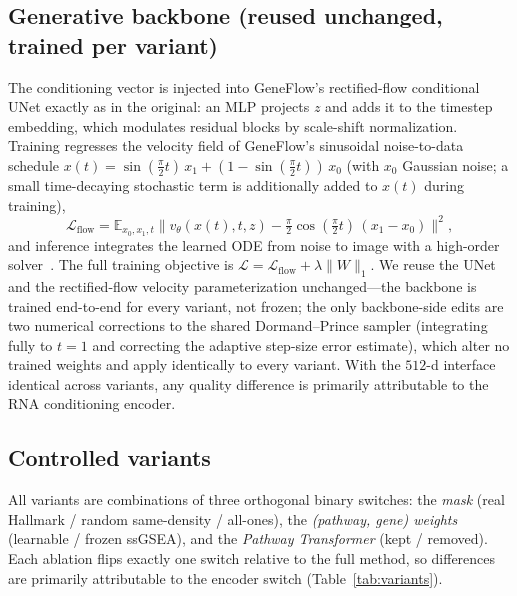 \documentclass[journal]{IEEEtran}
\begin{document}
\subsection{Generative backbone (reused unchanged, trained per variant)}
The conditioning vector is injected into GeneFlow's rectified-flow conditional
UNet exactly as in the original: an MLP projects $z$ and adds it to the timestep
embedding, which modulates residual blocks by scale-shift normalization. Training
regresses the velocity field of GeneFlow's sinusoidal noise-to-data schedule
$x(t)=\sin(\tfrac{\pi}{2}t)\,x_1+(1-\sin(\tfrac{\pi}{2}t))\,x_0$ (with $x_0$
Gaussian noise; a small time-decaying stochastic term is additionally added to
$x(t)$ during training),
\begin{equation}
\mathcal{L}_{\text{flow}}=\mathbb{E}_{x_0,x_1,t}\big\lVert v_\theta(x(t),t,z)-\tfrac{\pi}{2}\cos(\tfrac{\pi}{2}t)\,(x_1-x_0)\big\rVert^2,
\label{eq:flow}
\end{equation}
and inference integrates the learned ODE from noise to image with a high-order
solver~\cite{geneflow,sd3}. The full training objective is
$\mathcal{L}=\mathcal{L}_{\text{flow}}+\lambda\lVert W\rVert_1$. We reuse the UNet
and the rectified-flow velocity parameterization unchanged---the backbone is trained
end-to-end for every variant, not frozen; the only backbone-side
edits are two numerical corrections to the shared Dormand--Prince sampler
(integrating fully to $t{=}1$ and correcting the adaptive step-size error
estimate), which alter no trained weights and apply identically to every variant.
With the $512$-d interface identical across variants, any quality difference is primarily
attributable to the RNA conditioning encoder.

\subsection{Controlled variants}
\label{sec:variants}
All variants are combinations of three orthogonal binary switches: the
\emph{mask} (real Hallmark / random same-density / all-ones), the
\emph{(pathway, gene) weights} (learnable / frozen ssGSEA), and the
\emph{Pathway Transformer} (kept / removed). Each ablation flips exactly one
switch relative to the full method, so differences are primarily attributable to
the encoder switch (Table~\ref{tab:variants}).
\end{document}

